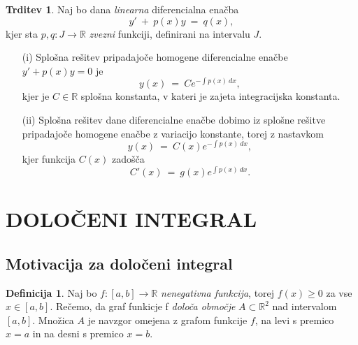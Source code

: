 \documentclass[11pt]{article}
\theoremstyle{definition}
\newtheorem{definicija}{Definicija}[section]
\theoremstyle{definition}
\newtheorem{trditev}{Trditev}[section]
\theoremstyle{definition}
\theoremstyle{theorem}
\begin{document}
\begin{trditev}

Naj bo dana \textit{linearna} diferencialna enačba 
$$y' ~+~ p(x) y ~=~ q(x),$$
kjer sta $p, q: J \rightarrow \mathbb{R}$ \textit{zvezni} funkciji, definirani na intervalu $J$.
\begin{enumerate}

	\item[(i)] Splošna rešitev pripadajoče homogene diferencialne enačbe \\ $y' + p(x) y = 0$ je
	$$y(x) ~=~ Ce^{-\int p(x)~dx},$$
	kjer je $C \in \mathbb{R}$ splošna konstanta, v kateri je zajeta integracijska konstanta.
	
	\item[(ii)] Splošna rešitev dane diferencialne enačbe dobimo iz splošne rešitve pripadajoče homogene enačbe z variacijo konstante, torej z nastavkom
	$$y(x) ~=~ C(x)e^{-\int p(x)~dx},$$
	kjer funkcija $C(x)$ zadošča
	$$C'(x) ~=~ g(x)e^{\int p(x)~dx}.$$

\end{enumerate}

\end{trditev}
\vspace{0.5cm}


\pagebreak


\section{DOLOČENI INTEGRAL}
\vspace{0.5cm}


\subsection{Motivacija za določeni integral}
\vspace{0.5cm}

\begin{definicija}

Naj bo $f:[a, b] \rightarrow \mathbb{R}$ \textit{nenegativna funkcija}, torej $f(x) \geq 0$ za vse $x \in [a, b]$. Rečemo, da graf funkicje f \textit{določa območje} $A \subset \mathbb{R}^2$  nad intervalom $[a, b]$. Množica $A$ je navzgor omejena z grafom funkcije $f$, na levi s premico $x=a$ in na desni s premico $x=b$.

\end{definicija}
\vspace{0.5cm}
\end{document}
